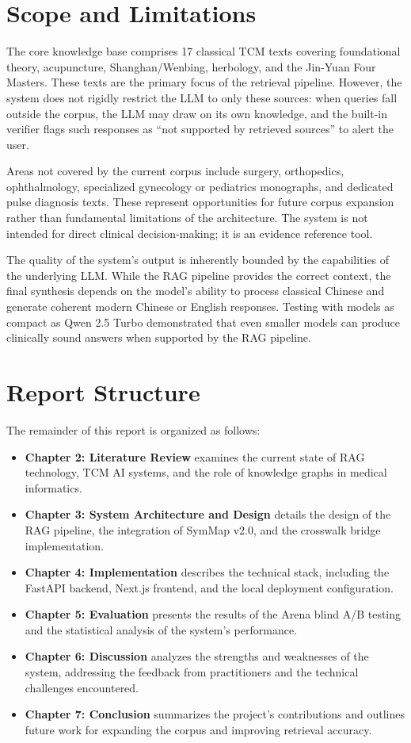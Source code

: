 \documentclass[11pt,a4paper]{report}
\begin{document}
\section{Scope and Limitations}
The core knowledge base comprises 17 classical TCM texts covering foundational theory, acupuncture, Shanghan/Wenbing, herbology, and the Jin-Yuan Four Masters. These texts are the primary focus of the retrieval pipeline. However, the system does not rigidly restrict the LLM to only these sources: when queries fall outside the corpus, the LLM may draw on its own knowledge, and the built-in verifier flags such responses as ``not supported by retrieved sources'' to alert the user.

Areas not covered by the current corpus include surgery, orthopedics, ophthalmology, specialized gynecology or pediatrics monographs, and dedicated pulse diagnosis texts. These represent opportunities for future corpus expansion rather than fundamental limitations of the architecture. The system is not intended for direct clinical decision-making; it is an evidence reference tool.

The quality of the system's output is inherently bounded by the capabilities of the underlying LLM. While the RAG pipeline provides the correct context, the final synthesis depends on the model's ability to process classical Chinese and generate coherent modern Chinese or English responses. Testing with models as compact as Qwen 2.5 Turbo demonstrated that even smaller models can produce clinically sound answers when supported by the RAG pipeline.

\section{Report Structure}
The remainder of this report is organized as follows:
\begin{itemize}
    \item \textbf{Chapter 2: Literature Review} examines the current state of RAG technology, TCM AI systems, and the role of knowledge graphs in medical informatics.
    \item \textbf{Chapter 3: System Architecture and Design} details the design of the RAG pipeline, the integration of SymMap v2.0, and the crosswalk bridge implementation.
    \item \textbf{Chapter 4: Implementation} describes the technical stack, including the FastAPI backend, Next.js frontend, and the local deployment configuration.
    \item \textbf{Chapter 5: Evaluation} presents the results of the Arena blind A/B testing and the statistical analysis of the system's performance.
    \item \textbf{Chapter 6: Discussion} analyzes the strengths and weaknesses of the system, addressing the feedback from practitioners and the technical challenges encountered.
    \item \textbf{Chapter 7: Conclusion} summarizes the project's contributions and outlines future work for expanding the corpus and improving retrieval accuracy.
\end{itemize}
\end{document}
